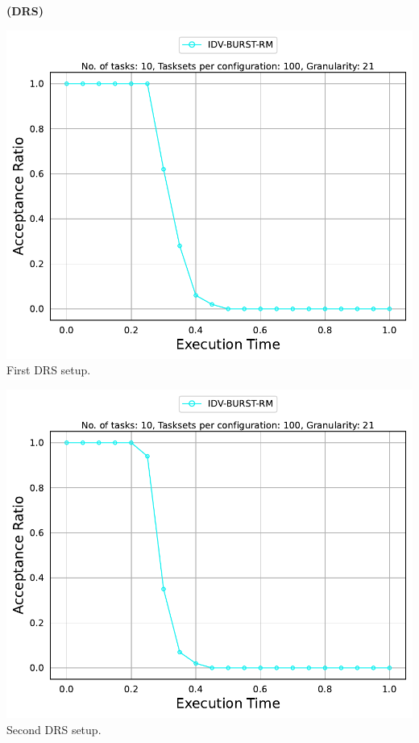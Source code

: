\documentclass[]{article}
\begin{document}
	\begin{minipage}[t]{0.48\linewidth}
		\centering
		\textbf{(DRS)}
		\vspace{0.3cm}
		
		\includegraphics[width=\linewidth]{IDV-BURST-RM_1stSetup_DRS.pdf}
		First DRS setup.
		\vspace{0.3cm}
		
		\includegraphics[width=\linewidth]{IDV-BURST-RM_2ndSetup_DRS.pdf}
		Second DRS setup.
		\vspace{0.3cm}
		

\end{minipage}
\end{document}
